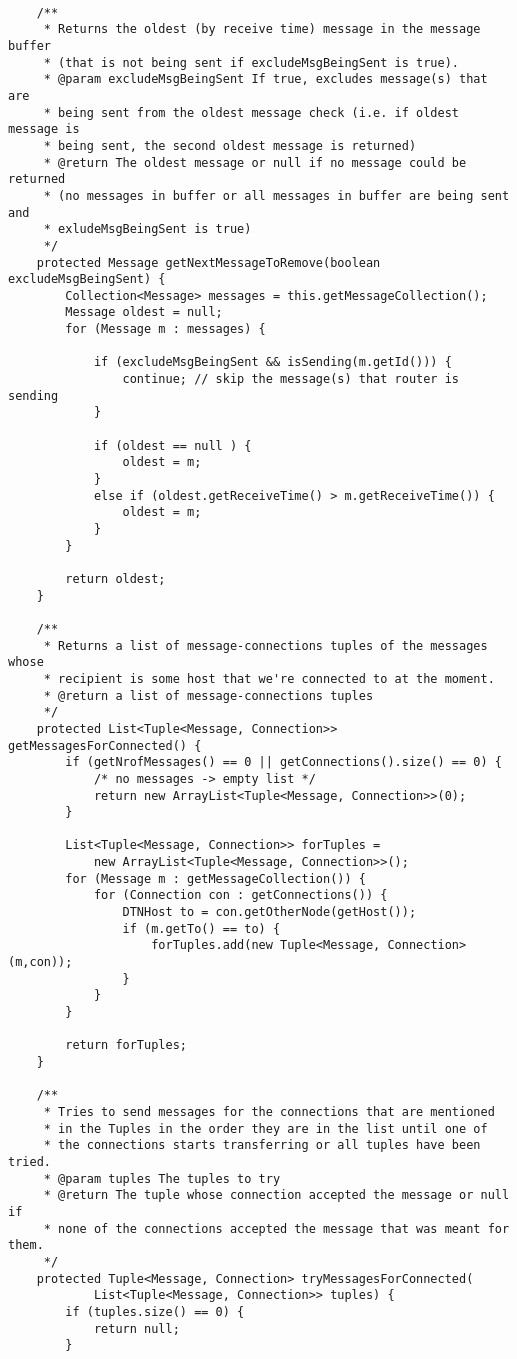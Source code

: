 \documentclass[11pt]{icsthesis}
\begin{document}
\begin{framed}
\begin{verbatim}
	
	/**
	 * Returns the oldest (by receive time) message in the message buffer 
	 * (that is not being sent if excludeMsgBeingSent is true).
	 * @param excludeMsgBeingSent If true, excludes message(s) that are
	 * being sent from the oldest message check (i.e. if oldest message is
	 * being sent, the second oldest message is returned)
	 * @return The oldest message or null if no message could be returned
	 * (no messages in buffer or all messages in buffer are being sent and
	 * exludeMsgBeingSent is true)
	 */
	protected Message getNextMessageToRemove(boolean excludeMsgBeingSent) {
		Collection<Message> messages = this.getMessageCollection();
		Message oldest = null;
		for (Message m : messages) {
			
			if (excludeMsgBeingSent && isSending(m.getId())) {
				continue; // skip the message(s) that router is sending
			}
			
			if (oldest == null ) {
				oldest = m;
			}
			else if (oldest.getReceiveTime() > m.getReceiveTime()) {
				oldest = m;
			}
		}
		
		return oldest;
	}
	
	/**
	 * Returns a list of message-connections tuples of the messages whose
	 * recipient is some host that we're connected to at the moment.
	 * @return a list of message-connections tuples
	 */
	protected List<Tuple<Message, Connection>> getMessagesForConnected() {
		if (getNrofMessages() == 0 || getConnections().size() == 0) {
			/* no messages -> empty list */
			return new ArrayList<Tuple<Message, Connection>>(0); 
		}

		List<Tuple<Message, Connection>> forTuples = 
			new ArrayList<Tuple<Message, Connection>>();
		for (Message m : getMessageCollection()) {
			for (Connection con : getConnections()) {
				DTNHost to = con.getOtherNode(getHost());
				if (m.getTo() == to) {
					forTuples.add(new Tuple<Message, Connection>(m,con));
				}
			}
		}
		
		return forTuples;
	}
	
	/**
	 * Tries to send messages for the connections that are mentioned
	 * in the Tuples in the order they are in the list until one of
	 * the connections starts transferring or all tuples have been tried.
	 * @param tuples The tuples to try
	 * @return The tuple whose connection accepted the message or null if
	 * none of the connections accepted the message that was meant for them.
	 */
	protected Tuple<Message, Connection> tryMessagesForConnected(
			List<Tuple<Message, Connection>> tuples) {
		if (tuples.size() == 0) {
			return null;
		}
		

\end{verbatim}
\end{framed}
\end{document}
